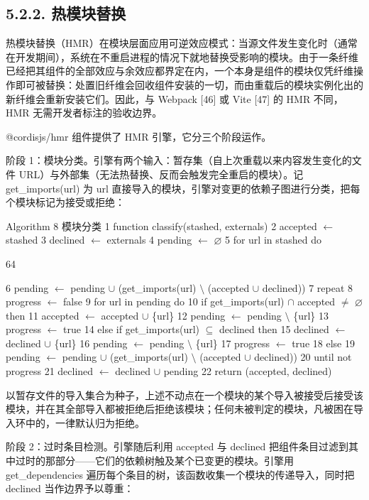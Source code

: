 \subsection{5.2.2. 热模块替换}\label{hot-module-replacement}

热模块替换（HMR）在模块层面应用可逆效应模式：当源文件发生变化时（通常在开发期间），系统在不重启进程的情况下就地替换受影响的模块。由于一条纤维已经把其组件的全部效应与余效应都界定在内，一个本身是组件的模块仅凭纤维操作即可被替换：处置旧纤维会回收组件安装的一切，而由重载后的模块实例化出的新纤维会重新安装它们。因此，与 Webpack {[}46{]} 或 Vite {[}47{]} 的 HMR 不同，HMR 无需开发者标注的验收边界。

@cordisjs/hmr 组件提供了 HMR 引擎，它分三个阶段运作。

阶段 1：模块分类。引擎有两个输入：暂存集（自上次重载以来内容发生变化的文件 URL）与外部集（无法热替换、反而会触发完全重启的模块）。记 get\_imports(url) 为 url 直接导入的模块，引擎对变更的依赖子图进行分类，把每个模块标记为接受或拒绝：

Algorithm 8 模块分类 1 function classify(stashed,
externals) 2 accepted $\leftarrow$ stashed 3 declined $\leftarrow$ externals 4 pending $\leftarrow$ $\varnothing$ 5
for url in stashed do

64

6 pending $\leftarrow$ pending $\cup$ (get\_imports(url) $\setminus$ (accepted $\cup$ declined)) 7
repeat 8 progress $\leftarrow$ false 9 for url in pending do 10 if
get\_imports(url) $\cap$ accepted $\neq$ $\varnothing$ then 11 accepted $\leftarrow$ accepted $\cup$ \{url\}
12 pending $\leftarrow$ pending $\setminus$ \{url\} 13 progress $\leftarrow$ true 14 else if
get\_imports(url) $\subseteq$ declined then 15 declined $\leftarrow$ declined $\cup$ \{url\} 16
pending $\leftarrow$ pending $\setminus$ \{url\} 17 progress $\leftarrow$ true 18 else 19 pending $\leftarrow$
pending $\cup$ (get\_imports(url) $\setminus$ (accepted $\cup$ declined)) 20 until not
progress 21 declined $\leftarrow$ declined $\cup$ pending 22 return (accepted, declined)

以暂存文件的导入集合为种子，上述不动点在一个模块的某个导入被接受后接受该模块，并在其全部导入都被拒绝后拒绝该模块；任何未被判定的模块，凡被困在导入环中的，一律默认归为拒绝。

阶段 2：过时条目检测。引擎随后利用 accepted 与 declined 把组件条目过滤到其中过时的那部分——它们的依赖树触及某个已变更的模块。引擎用 get\_dependencies 遍历每个条目的树，该函数收集一个模块的传递导入，同时把 declined 当作边界予以尊重：

